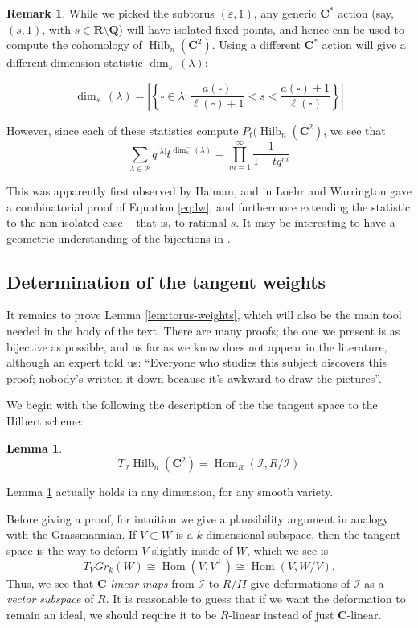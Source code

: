 \documentclass{amsart}[12pt]
\theoremstyle{definition}
\newtheorem{lemma}[dummy]{Lemma}
\newtheorem{remark}[dummy]{Remark}
\newcommand{\C}{\mathbf{C}}
\newcommand{\R}{\mathbf{R}}
\newcommand{\Q}{\mathbf{Q}}
\newcommand{\PP}{\mathcal{P}} %
\newcommand{\II}{\mathcal{I}}
\DeclareMathOperator{\Hilb}{Hilb}
\DeclareMathOperator{\Hom}{Hom}
\begin{document}
\begin{remark}
  While we picked the subtorus $(\varepsilon, 1)$, any generic $\C^*$ action (say, $(s,1)$, with $s\in\R\setminus\Q$) will have isolated fixed points, and hence can be used to compute the cohomology of $\Hilb_n(\C^2)$.  Using a different $\C^*$ action will give a different dimension statistic $\dim_s^-(\lambda)$:

\[ \dim_s^-(\lambda)=\left|\left\{\square\in\lambda : \frac{a(\square)}{\ell(\square)+1}<s<\frac{a(\square)+1}{\ell(\square)}\right\}\right| \]

However, since each of these statistics compute $P_t(\Hilb_n(\C^2)$, we see that
\begin{equation} \label{eq:lw} \sum_{\lambda\in\PP} q^{|\lambda|}t^{\dim_s^-(\lambda)}=\prod_{m=1}^\infty \frac{1}{1-tq^m}
  \end{equation}

This was apparently first observed by Haiman, and in \cite{LW} Loehr and Warrington gave a combinatorial proof of Equation \ref{eq:lw}, and furthermore extending the statistic to the non-isolated case -- that is, to rational $s$.  It may be interesting to have a geometric understanding of the bijections in \cite{LW}.
\end{remark}


\subsection{Determination of the tangent weights}

It remains to prove Lemma \ref{lem:torus-weights}, which will also be the main tool needed in the body of the text.  There are many proofs; the one we present is as bijective as possible, and as far as we know does not appear in the literature, although an expert told us: ``Everyone who studies this subject discovers this proof; nobody's written it down because it's awkward to draw the pictures''.


We begin with the following the description of the the tangent space to the Hilbert scheme:
\begin{lemma} \label{lem:tangent-hom}
$$T_{\II}\Hilb_n(\C^2)=\Hom_R(\II,R/\II)$$
\end{lemma}
Lemma \ref{lem:tangent-hom} actually holds in any dimension, for any smooth variety.

Before giving a proof, for intuition we give a plausibility argument in analogy with the Grassmannian.  If $V\subset W$ is a $k$ dimensional subspace, then the tangent space is the way to deform $V$ slightly inside of $W$, which we see is
\[T_V Gr_k(W)\cong \Hom(V, V^\perp) \cong \Hom(V, W/V).\]
Thus, we see that  \emph{$\C$-linear maps} from $\II$ to $R/II$ give deformations of $\II$ as a \emph{vector subspace} of $R$.  It is reasonable to guess that if we want the deformation to remain an ideal, we should require it to be $R$-linear instead of just $\C$-linear.
\end{document}
